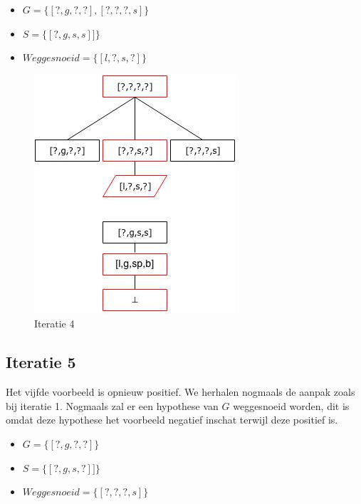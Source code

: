 \documentclass{article}
\begin{document}
\begin{itemize}
\item $G = \{[?,g,?,?],[?,?,?,s]\}$
\item $S = \{[?,g,s,s]]\}$
\item $Weggesnoeid = \{[l,?,s,?]\}$
\end{itemize}

\begin{figure}[H]
\centering
\caption{Iteratie 4}
\label{iteratie4}
\includegraphics[scale=0.5]{iteration_graphs/iteration4.jpg}
\end{figure}

\newpage

\subsection{Iteratie 5}
Het vijfde voorbeeld is opnieuw positief. We herhalen nogmaals de aanpak zoals bij iteratie 1. Nogmaals zal er een hypothese van $G$ weggesnoeid worden, dit is omdat deze hypothese het voorbeeld negatief inschat terwijl deze positief is.

\begin{itemize}
\item $G = \{[?,g,?,?]\}$
\item $S = \{[?,g,s,?]]\}$
\item $Weggesnoeid = \{[?,?,?,s]\}$
\end{itemize}
\end{document}
